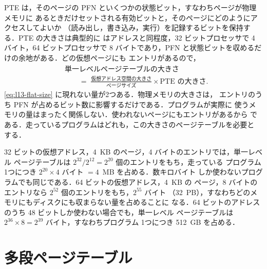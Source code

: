 \documentclass[../main.tex]{subfiles}
\begin{document}
PTE は，そのページの PFN といくつかの状態ビット，すなわちページが物理メモリに
あるときだけセットされる有効ビットと，そのページにどのようにアクセスしてよいか
（読み出し，書き込み，実行）を記録するビットを保持する．PTE の大きさは典型的に
はアドレスと同程度，32 ビットプロセッサで 4 バイト，64 ビットプロセッサで 8
バイトであり，PFN と状態ビットを収めるだけの余地がある．どの仮想ページにも
エントリがあるので，
\begin{equation}
  \begin{aligned}
    &\text{単一レベルページテーブルの大きさ} \\
    &\qquad =\; \frac{\text{仮想アドレス空間の大きさ}}{\text{ページサイズ}}
      \times \text{PTE の大きさ} .
  \end{aligned}
  \label{eq:l13-flat-size}
\end{equation}
\cref{eq:l13-flat-size} に現れない量が2つある．物理メモリの大きさは，
エントリのうち PFN が占めるビット数に影響するだけである．プログラムが実際に
使うメモリの量はまったく関係しない．使われないページにもエントリがあるから
である．走っているプログラムはどれも，この大きさのページテーブルを必要と
する．

\begin{example}
  \label{ex:l13-flat-size}
  32 ビットの仮想アドレス，4~KB のページ，4 バイトのエントリでは，単一レベル
  ページテーブルは $2^{32}/2^{12} = 2^{20}$ 個のエントリをもち，走っている
  プログラム1つにつき $2^{20} \times 4$ バイト $= 4$~MB を占める．数キロバイト
  しか使わないプログラムでも同じである．64 ビットの仮想アドレス，4~KB の
  ページ，8 バイトのエントリなら $2^{52}$ 個のエントリをもち，$2^{55}$ バイト
  （32~PB），すなわちどのメモリにもディスクにも収まらない量を占めることに
  なる．64 ビットのアドレスのうち 48 ビットしか使わない場合でも，単一レベル
  ページテーブルは $2^{36} \times 8 = 2^{39}$ バイト，すなわちプログラム
  1つにつき 512~GB を占める．
\end{example}

\section{多段ページテーブル}
\label{sec:l13-multilevel}
\end{document}
